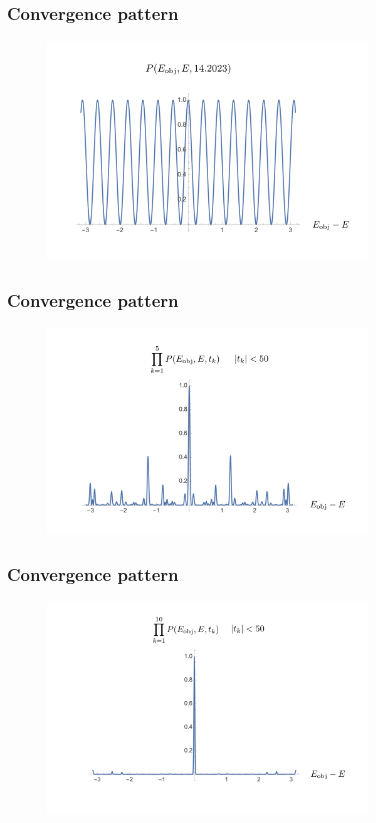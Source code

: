 \documentclass{beamer}
\begin{document}
\begin{frame}
\frametitle{Convergence pattern}

\begin{figure}
\centering
\includegraphics[width=8.5cm]{rodeofigs/rodeo3.png}
\end{figure} 

\end{frame}

\begin{frame}
\frametitle{Convergence pattern}

\begin{figure}
\centering
\includegraphics[width=8.5cm]{rodeofigs/rodeo4.png}
\end{figure} 

\end{frame}

\begin{frame}
\frametitle{Convergence pattern}

\begin{figure}
\centering
\includegraphics[width=8.5cm]{rodeofigs/rodeo5.png}
\end{figure} 

\end{frame}
\end{document}
